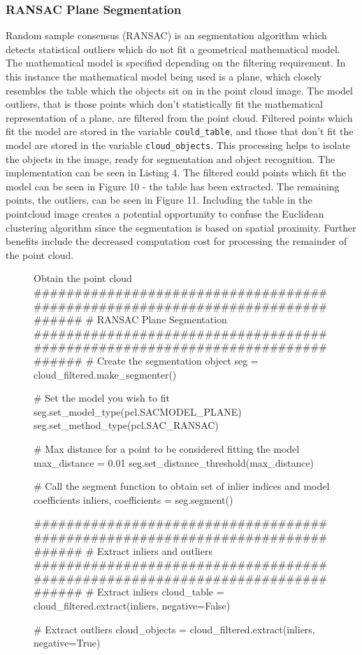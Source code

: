 \documentclass[a4paper]{article}
\begin{document}
\newpage

\subsubsection{RANSAC Plane Segmentation}
Random sample consensus (RANSAC) is an segmentation algorithm which detects statistical outliers which do not fit a geometrical mathematical model. The mathematical model is specified depending on the filtering requirement. In this instance the mathematical model being used is a plane, which closely resembles the table which the objects sit on in the point cloud image. The model outliers, that is those points which don't statistically fit the mathematical representation of a plane, are filtered from the point cloud. Filtered points which fit the model are stored in the variable \verb|could_table|, and those that don't fit the model are stored in the variable \verb|cloud_objects|. This processing helps to isolate the objects in the image, ready for segmentation and object recognition. The implementation can be seen in Listing 4. The filtered could points which fit the model can be seen in Figure 10 - the table has been extracted. The remaining points, the outliers, can be seen in Figure 11. Including the table in the pointcloud image creates a potential opportunity to confuse the Euclidean clustering algorithm since the segmentation is based on spatial proximity. Further benefits include the decreased computation cost for processing the remainder of the point cloud.

\vspace{0.25cm}

\begin{figure}[h]\scriptsize
\begin{sexylisting}{Obtain the point cloud}
##############################################################################
    # RANSAC Plane Segmentation
##############################################################################
    # Create the segmentation object
    seg = cloud_filtered.make_segmenter()

    # Set the model you wish to fit
    seg.set_model_type(pcl.SACMODEL_PLANE)
    seg.set_method_type(pcl.SAC_RANSAC)

    # Max distance for a point to be considered fitting the model
    max_distance = 0.01
    seg.set_distance_threshold(max_distance)

    # Call the segment function to obtain set of inlier indices and model coefficients
    inliers, coefficients = seg.segment()
    
##############################################################################
    # Extract inliers and outliers
##############################################################################
    # Extract inliers
    cloud_table = cloud_filtered.extract(inliers, negative=False)

    # Extract outliers
    cloud_objects = cloud_filtered.extract(inliers, negative=True)
\end{sexylisting}
\end{figure}
\end{document}
